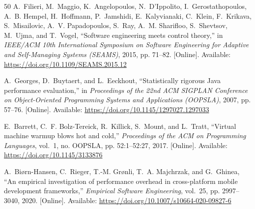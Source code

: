 \documentclass[14pt,a4paper,oneside]{extreport}
\begin{document}
\begin{thebibliography}{50}
\BIBentryALTinterwordspacing
A.~Filieri, M.~Maggio, K.~Angelopoulos, N.~D'Ippolito, I.~Gerostathopoulos,
  A.~B. Hempel, H.~Hoffmann, P.~Jamshidi, E.~Kalyvianaki, C.~Klein, F.~Krikava,
  S.~Misailovic, A.~V. Papadopoulos, S.~Ray, A.~M. Sharifloo, S.~Shevtsov,
  M.~Ujma, and T.~Vogel, ``Software engineering meets control theory,'' in
  \emph{IEEE/ACM 10th International Symposium on Software Engineering for
  Adaptive and Self-Managing Systems (SEAMS)}, 2015, pp. 71--82. [Online].
  Available: \url{https://doi.org/10.1109/SEAMS.2015.12}
\BIBentrySTDinterwordspacing

\BIBentryALTinterwordspacing
A.~Georges, D.~Buytaert, and L.~Eeckhout, ``Statistically rigorous {Java}
  performance evaluation,'' in \emph{Proceedings of the 22nd ACM SIGPLAN
  Conference on Object-Oriented Programming Systems and Applications (OOPSLA)},
  2007, pp. 57--76. [Online]. Available:
  \url{https://doi.org/10.1145/1297027.1297033}
\BIBentrySTDinterwordspacing

\BIBentryALTinterwordspacing
E.~Barrett, C.~F. Bolz-Tereick, R.~Killick, S.~Mount, and L.~Tratt, ``Virtual
  machine warmup blows hot and cold,'' \emph{Proceedings of the ACM on
  Programming Languages}, vol.~1, no. OOPSLA, pp. 52:1--52:27, 2017. [Online].
  Available: \url{https://doi.org/10.1145/3133876}
\BIBentrySTDinterwordspacing

\BIBentryALTinterwordspacing
A.~Bi{\o}rn-Hansen, C.~Rieger, T.-M. Gr{\o}nli, T.~A. Majchrzak, and G.~Ghinea,
  ``An empirical investigation of performance overhead in cross-platform mobile
  development frameworks,'' \emph{Empirical Software Engineering}, vol.~25, pp.
  2997--3040, 2020. [Online]. Available:
  \url{https://doi.org/10.1007/s10664-020-09827-6}
\BIBentrySTDinterwordspacing

\end{thebibliography}
\endgroup
\end{document}
